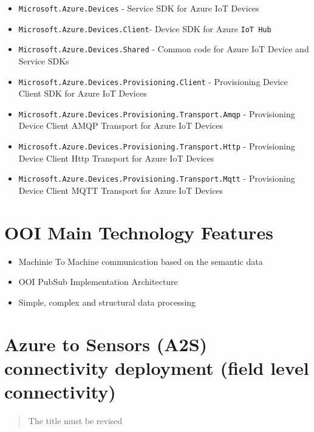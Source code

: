 \documentclass{jacsart}
\providecommand{\tightlist} { \setlength{\itemsep}{0pt}\setlength{\parskip}{0pt}}
\begin{document}
\begin{itemize}
\tightlist
\item
  \texttt{Microsoft.Azure.Devices} - Service SDK for Azure IoT Devices
\item
  \texttt{Microsoft.Azure.Devices.Client}- Device SDK for Azure \texttt{IoT\ Hub}
\item
  \texttt{Microsoft.Azure.Devices.Shared} - Common code for Azure IoT
  Device and Service SDKs
\item
  \texttt{Microsoft.Azure.Devices.Provisioning.Client} - Provisioning
  Device Client SDK for Azure IoT Devices
\item
  \texttt{Microsoft.Azure.Devices.Provisioning.Transport.Amqp} -
  Provisioning Device Client AMQP Transport for Azure IoT Devices
\item
  \texttt{Microsoft.Azure.Devices.Provisioning.Transport.Http} -
  Provisioning Device Client Http Transport for Azure IoT Devices
\item
  \texttt{Microsoft.Azure.Devices.Provisioning.Transport.Mqtt} -
  Provisioning Device Client MQTT Transport for Azure IoT Devices
\end{itemize}

\hypertarget{ooi-main-technology-features}{%
  \section{OOI Main Technology
    Features}\label{ooi-main-technology-features}}

\begin{itemize}
  \tightlist
  \item
        Machinie To Machine communication based on the semantic data
  \item
        OOI PubSub Implementation Architecture
  \item
        Simple, complex and structural data processing
\end{itemize}

\hypertarget{azure-to-sensors-a2s-connectivity-deployment-field-level-connectivity}{%
  \section{Azure to Sensors (A2S) connectivity deployment (field level
    connectivity)}\label{azure-to-sensors-a2s-connectivity-deployment-field-level-connectivity}}

\begin{quote}
  The title must be revised
\end{quote}
\end{document}
